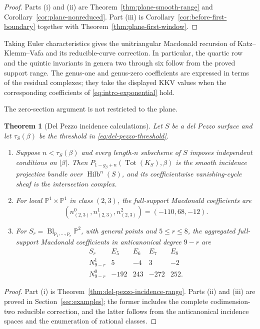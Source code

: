 \documentclass[11pt,reqno]{amsart}
\newtheorem{theorem}{Theorem}[section]
\theoremstyle{definition}
\newcommand{\Pp}{\mathbb P}
\newcommand{\Hilb}{\operatorname{Hilb}}
\newcommand{\Tot}{\operatorname{Tot}}
\begin{document}
\begin{proof}
Parts \textnormal{(i)} and \textnormal{(ii)} are
Theorem~\ref{thm:plane-smooth-range} and
Corollary~\ref{cor:plane-nonreduced}.  Part \textnormal{(iii)} is
Corollary~\ref{cor:before-first-boundary} together with
Theorem~\ref{thm:plane-first-window}.
\end{proof}

Taking Euler characteristics gives the unitriangular Macdonald recursion of
Katz--Klemm--Vafa and its reducible-curve correction.  In particular, the
quartic row and the quintic invariants in genera two through six follow from
the proved support range.  The genus-one and genus-zero coefficients are
expressed in terms of the residual complexes; they take the displayed KKV
values when the corresponding coefficients of
\eqref{eq:intro-exponential} hold.

The zero-section argument is not restricted to the plane.

\begin{theorem}[Del Pezzo incidence calculations]
\label{thm:intro-del-pezzo}
Let $S$ be a del Pezzo surface and let $\tau_S(\beta)$ be the threshold in
\eqref{eq:del-pezzo-threshold}.
\begin{enumerate}[label=\textnormal{(\roman*)},leftmargin=9mm]
\item Suppose $n<\tau_S(\beta)$ and every length-$n$ subscheme of $S$
imposes independent conditions on $|\beta|$.  Then
$P_{1-g_\beta+n}(\Tot(K_S),\beta)$ is the smooth incidence projective
bundle over $\Hilb^n(S)$, and its coefficientwise vanishing-cycle sheaf is
the intersection complex.

\item For local $\Pp^1\times\Pp^1$ in class $(2,3)$, the full-support
Macdonald coefficients are
\[
 (n_{(2,3)}^0,n_{(2,3)}^1,n_{(2,3)}^2)=(-110,68,-12).
\]

\item For $S_r=\operatorname{Bl}_{p_1,\ldots,p_r}\Pp^2$, with general
points and $5\le r\le8$, the aggregated full-support Macdonald
coefficients in anticanonical degree $9-r$ are
\[
\begin{array}{c|rrrr}
S_r&E_5&E_6&E_7&E_8\\ \hline
N_{9-r}^1&5&-4&3&-2\\
N_{9-r}^0&-192&243&-272&252.
\end{array}
\]
\end{enumerate}
\end{theorem}

\begin{proof}
Part \textnormal{(i)} is Theorem~\ref{thm:del-pezzo-incidence-range}.
Parts \textnormal{(ii)} and \textnormal{(iii)} are proved in
Section~\ref{sec:examples}; the former includes the complete codimension-two
reducible correction, and the latter follows from the anticanonical
incidence spaces and the enumeration of rational classes.
\end{proof}
\end{document}
